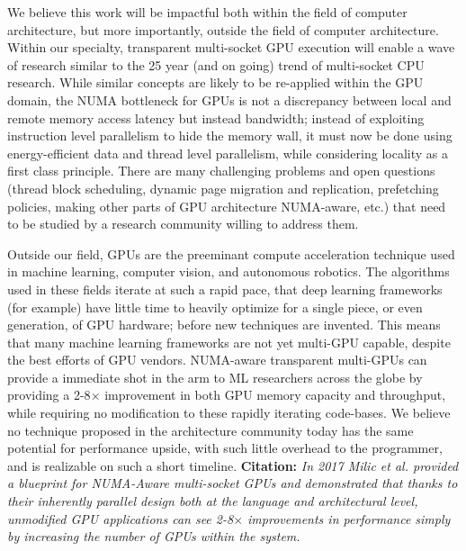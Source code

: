 \documentclass{sig-alternate}
\begin{document}
We believe this work will be impactful both within the field of computer architecture, but 
more importantly, outside the field of computer architecture.  Within our 
specialty, transparent multi-socket GPU execution will enable a wave of research 
similar to the 25 year (and on going) trend of multi-socket CPU 
research. While similar concepts are likely to be re-applied within the GPU domain, 
the NUMA bottleneck for GPUs is not a discrepancy between local and remote 
memory access latency but instead bandwidth;  instead of exploiting instruction 
level parallelism to hide the memory wall, it must now be done using energy-efficient 
data and thread level parallelism, while considering locality as a first class principle. 
There are many challenging problems and 
open questions (thread block scheduling, dynamic page migration and replication, 
prefetching policies, making other parts of GPU architecture NUMA-aware, etc.\@) 
that need to be studied by a research community willing to address them.

Outside our field,  GPUs are the preeminant compute acceleration technique used in
machine learning, computer vision, and autonomous robotics.  The algorithms
used in these fields iterate at such a rapid pace, that deep learning frameworks (for example)
have little time to heavily optimize for a single piece, or even generation, of GPU hardware;
before new techniques are invented.  This means that many machine learning frameworks
are not yet multi-GPU capable, despite the best efforts of GPU vendors. NUMA-aware
transparent multi-GPUs can provide a immediate shot in the arm to ML researchers
across the globe by providing a 2-8$\times$ improvement in both GPU memory capacity and
throughput, while requiring no modification to these rapidly iterating code-bases.
We believe no technique proposed in the architecture community today has the same potential
for performance upside, with such little overhead to the programmer, and is realizable on
such a short timeline. \textbf{Citation:} \textit{In 2017 Milic et al. provided a blueprint for NUMA-Aware
multi-socket GPUs and demonstrated that thanks to their inherently parallel design both at
the language and architectural level, unmodified GPU applications can see 2-8$\times$ improvements 
in performance simply by increasing the number of GPUs within the system.}


\vspace{-0.1in}

\end{document}
